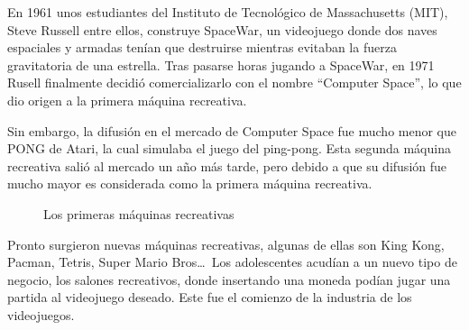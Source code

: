 En 1961 unos estudiantes del Instituto de Tecnológico de Massachusetts (MIT), Steve Russell entre ellos, construye SpaceWar, un videojuego donde dos naves espaciales y armadas tenían que destruirse mientras evitaban la fuerza gravitatoria de una estrella. Tras pasarse horas jugando a SpaceWar, en 1971 Rusell finalmente decidió comercializarlo con el nombre ``Computer Space'', lo que dio origen a la primera máquina recreativa. 
\newline

Sin embargo, la difusión en el mercado de Computer Space fue mucho menor que PONG de Atari, la cual simulaba el juego del ping-pong. Esta segunda máquina recreativa salió al mercado un año más tarde, pero debido a que su difusión fue mucho mayor es considerada como la primera máquina recreativa. 
\newline

\begin{figure}[h]
	\centering	
	\caption{Los primeras máquinas recreativas}
\end{figure}

Pronto surgieron nuevas máquinas recreativas, algunas de ellas son King Kong, Pacman, Tetris, Super Mario Bros\ldots\ Los adolescentes acudían a un nuevo tipo de negocio, los salones recreativos, donde insertando una moneda podían jugar una partida al videojuego deseado. Este fue el comienzo de la industria de los videojuegos. 
\newline 

